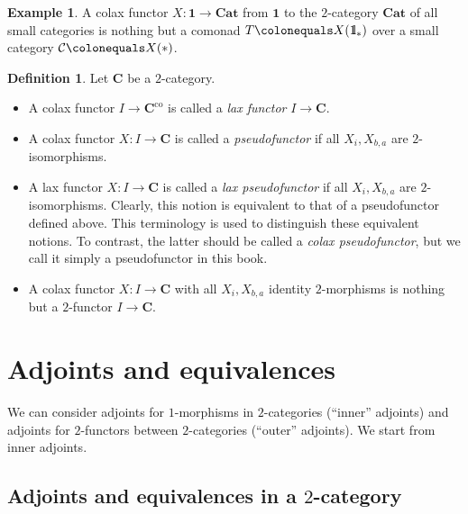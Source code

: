 \documentclass{surv-l}
\numberwithin{equation}{chapter}
\numberwithin{figure}{chapter}
\theoremstyle{plain}
\theoremstyle{definition}
\newtheorem{dfn}[thm]{Definition}
\newtheorem{exm}[thm]{Example}
\theoremstyle{remark}
\newcommand{\id}{1\kern-.25em{\text{{\rm l}}}}
\begin{document}
\begin{exm}
A colax functor $X \colon \mathbf{1} \to \mathbf{Cat}$
from $\mathbf{1}$
to the $2$-category $\mathbf{Cat}$ of all small categories
is nothing but a comonad $T\colonequals X(\id_*)$ over
a small category ${\mathcal{C}}\colonequals X(*)$.
\end{exm}

\begin{dfn}
Let $\mathbf{C}$ be a $2$-category.
\begin{itemize}
\item
A colax functor $I \to \mathbf{C}^{\text{co}}$ is called
a \emph{lax functor} $I \to \mathbf{C}$.
\item
A colax functor $X \colon I \to \mathbf{C}$ is called a \emph{pseudofunctor}
if all $X_i, X_{b,a}$ are $2$-isomorphisms.
\item
A lax functor $X \colon I \to \mathbf{C}$ is called a \emph{lax pseudofunctor} if all $X_i, X_{b,a}$ are $2$-isomorphisms.
Clearly, this notion is equivalent to that of a pseudofunctor defined above.
This terminology is used to distinguish these equivalent notions.
To contrast, the latter should be called a {\em colax pseudofunctor},
but we call it simply a pseudofunctor in this book.
\item
A colax functor $X \colon I \to \mathbf{C}$ with all $X_i, X_{b,a}$ identity $2$-morphisms
is nothing but a $2$-functor $I \to \mathbf{C}$.
\end{itemize}
\end{dfn}

\section{Adjoints and equivalences}We can consider adjoints for $1$-morphisms in $2$-categories
(``inner'' adjoints) and adjoints for $2$-functors between
$2$-categories (``outer'' adjoints).
We start from inner adjoints.

\subsection{Adjoints and equivalences in a $2$-category}
\end{document}

